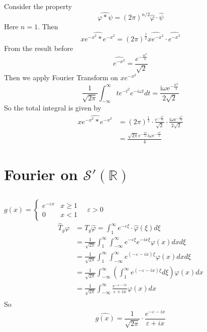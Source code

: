 \documentclass{article}
\begin{document}
\subsection{}
Consider the property
\[
	\widehat{\varphi * \psi}=(2 \pi)^{n / 2} \hat{\varphi} \cdot \hat{\psi}
\]
Here $n=1$. Then
\[
	\widehat{x e^{-x^{2}}*e^{-x^{2}}} = (2 \pi)^{\frac{1}{2}} \widehat{x e^{-x^{2}}}\cdot \widehat{e^{-x^{2}}}
\]
From the result before
\[
	\widehat{e^{-x^{2}}}=\frac{e^{-\frac{w^{2}}{4}}}{\sqrt{2}}
\]
Then we apply Fourier Transform on $x e^{-x^{2}}$
\[
	\frac{1}{\sqrt{2\pi}}\int_{-\infty}^{\infty} t e^{-t^{2}}  e^{-i \omega t} d t = \frac{ \mathrm{i} \omega \mathrm{e}^{-\frac{w^{2}}{4}}}{2\sqrt{2}}
\]
So the total integral is given by
\begin{align*}
	\widehat{x e^{-x^{2}}*e^{-x^{2}}} &= (2 \pi)^{\frac{1}{2}}\cdot \frac{e^{-\frac{w^{2}}{4}}}{\sqrt{2}}\cdot  \frac{ \mathrm{i} \omega \mathrm{e}^{-\frac{w^{2}}{4}}}{2\sqrt{2}}\\
	&=\frac{\sqrt{2 \pi} e^{-\frac{w^{2}}{4}} i \omega e^{-\frac{w^{2}}{4}} }{4}
\end{align*}
\section{Fourier on $\mathcal{S'}(\mathbb{R})$}
\subsection{}
$g(x) = \left\{\begin{array}{ll}{e^{-\varepsilon x}} & {x \geq 1} \\ {0} & {x<1}\end{array}\right. \quad \varepsilon>0$
\begin{align*}
	\hat{T}_{g} \varphi&=T_{g} \hat{\varphi}=\int_{1}^{\infty} e^{-\varepsilon \xi} \cdot \hat{\varphi}(\xi) d \xi\\
	&=\frac{1}{\sqrt{2 \pi}} \int_{1}^{\infty} \int_{-\infty}^{\infty} e^{-\varepsilon \xi} e^{-i x \xi} \varphi(x) d x d \xi \\
	&=\frac{1}{\sqrt{2 \pi}} \int_{1}^{\infty} \int_{-\infty}^{\infty} e^{(-\varepsilon -i x )\xi} \varphi(x) d x d \xi \\
	&= \frac{1}{\sqrt{2 \pi}}  \int_{-\infty}^{\infty} \left(\int_{1}^{\infty} e^{(-\varepsilon -i x )\xi} d \xi\right) \varphi(x) d x  \\
	&= \frac{1}{\sqrt{2 \pi}}  \int_{-\infty}^{\infty} \frac{e^{-\varepsilon-ix}}{\varepsilon+ix} \varphi(x) d x  \\
\end{align*}
So 
\[
	\hat{g(x)} =  \frac{1}{\sqrt{2 \pi}}\cdot \frac{e^{-\varepsilon-ix}}{\varepsilon+ix}
\]
\end{document}
